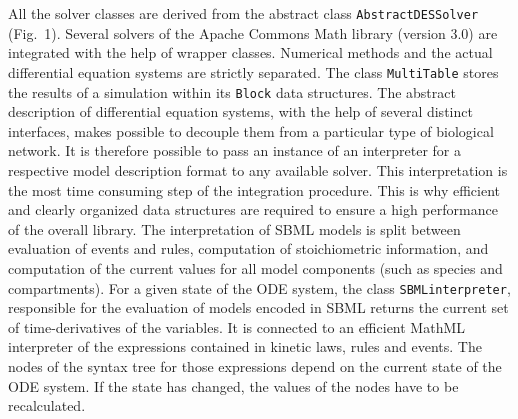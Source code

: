 \documentclass[10pt]{bmc_article}
\newenvironment{bmcformat}{\baselineskip20pt\sloppy\setboolean{publ}{false}}{\baselineskip20pt\sloppy}
\newcommand{\AbstractDESSolver}{\texttt{Abstract\-DES\-Solver}}
\newcommand{\SBMLinterpreter}{\texttt{SBML\-interpreter}}
\newcommand{\MultiTable}{\texttt{Multi\-Table}}
\newcommand{\Block}{\texttt{Block}}
\begin{document}
\begin{bmcformat}
All the solver classes are derived from the abstract class \AbstractDESSolver{}
(Fig.~1).
Several solvers of the Apache Commons Math library (version 3.0) are integrated
with the help of wrapper classes. Numerical methods and the actual differential
equation systems are strictly separated. The class \MultiTable{} stores the
results of a simulation within its \Block{} data structures. 
%
The abstract description of differential equation systems, with the help of
several distinct interfaces, makes possible to decouple them from a particular
type of biological network. It is therefore possible to pass an instance of an
interpreter for a respective model description format to any available solver.
%
This interpretation is the most time consuming step of the integration procedure.
This is why efficient and clearly organized data structures are required to
ensure a high performance of the overall library. The interpretation of SBML
models is split between evaluation of events and rules, computation of
stoichiometric information, and computation of the current values for all model
components (such as species and compartments).
%
For a given state of the ODE system, the class \SBMLinterpreter, responsible
for the evaluation of models encoded in SBML returns the current set of
time-derivatives of the variables.
It is connected to an efficient MathML interpreter of the expressions contained
in kinetic laws, rules and events. The nodes of the syntax tree for those
expressions depend on the current state of the ODE system. If the state has
changed, the values of the nodes have to be recalculated.


\end{bmcformat}
\end{document}

